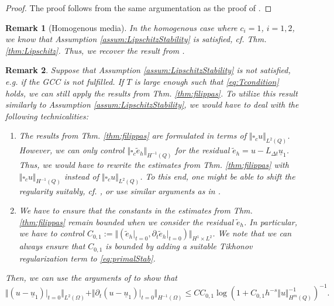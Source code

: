 \documentclass[sn-mathphys-num]{sn-jnl}
\newtheorem{rmk}{Remark}
\numberwithin{equation}{section}
\newcommand{\wop}{\square_c}
\newcommand{\ul}{\underline{u}}
\newcommand{\dt}{\partial_t}
\begin{document}
\begin{proof}
    The proof follows from the same argumentation as the proof of \cite[Thm. 4.4]{BP24}.
\end{proof}


\begin{rmk}[Homogenous media]\label{rem:homMedia}
    In the homogenous case where $c_i = 1$, $i = 1,2$, we know that Assumption \ref{assum:LipschitzStability} is satisfied, cf. Thm. \ref{thm:Lipschitz}. Thus, we recover the result from \cite[Thm. 4.4]{BP24}.
\end{rmk}

\begin{rmk}
    Suppose that Assumption \ref{assum:LipschitzStability} is not satisfied, e.g. if the GCC is not fulfilled. If $T$ is large enough such that \eqref{eq:Tcondition} holds, we can still apply the results from Thm. \ref{thm:filippas}. To utilize this result similarly to Assumption \ref{assum:LipschitzStability}, we would have to deal with the following technicalities:  
    \begin{enumerate}
        \item The results from Thm. \ref{thm:filippas} are formulated in terms of $\Vert \wop u \Vert_{L^2(Q)}$. However, we can only control $\Vert \wop \tilde{e}_h \Vert_{H^{-1}(Q)}$ for the residual $\tilde{e}_h = u - L_{\Delta t} \ul_1$. Thus, we would have to rewrite the estimates from Thm. \ref{thm:filippas} with $\Vert \wop u \Vert_{H^{-1}(Q)}$ instead of $\Vert \wop u \Vert_{L^2(Q)}$. To this end, one might be able to shift the regularity suitably, cf. \cite[Sec. 2.6]{StolkPhD}, or use similar arguments as in \cite[Thm. A.1]{BFMO21}.
        \item We have to ensure that the constants in the estimates from Thm. \ref{thm:filippas} remain bounded when we consider the residual $\tilde{e}_h$. In particular, we have to control $C_{0,1} := \Vert (\tilde{e}_h \vert_{t = 0}, \dt \tilde{e}_h \vert_{t = 0}) \Vert_{H^1 \times L^2}$. We note that we can always ensure that $C_{0,1}$ is bounded by adding a suitable Tikhonov regularization term to \eqref{eq:primalStab}. 
    \end{enumerate}
    Then, we can use the arguments of \cite[Thm. 4.4]{BP24} to show that 
    \begin{equation}
        \Vert (u - \ul_1) \vert_{t = 0} \Vert_{L^2(\Omega)}  + \Vert \dt (u - \ul_1) \vert_{t = 0} \Vert_{H^{-1}(\Omega)} \le C C_{0,1} \log(1 + C_{0,1} h^{-s} \Vert u \Vert_{H^m(Q)}^{-1})^{-1}. 
    \end{equation}
\end{rmk}
\end{document}
